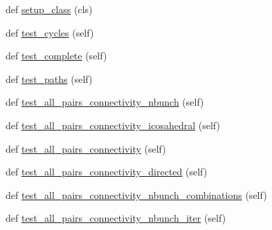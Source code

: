 \begin{DoxyCompactItemize}
\item 
def \hyperlink{classnetworkx_1_1algorithms_1_1connectivity_1_1tests_1_1test__connectivity_1_1TestAllPairsNodeConnectivity_a3beae3db8f0c8ea6da04f67d5e2da9e1}{setup\+\_\+class} (cls)
\item 
def \hyperlink{classnetworkx_1_1algorithms_1_1connectivity_1_1tests_1_1test__connectivity_1_1TestAllPairsNodeConnectivity_aab4446e118725f03c9a0b00e8c8c8572}{test\+\_\+cycles} (self)
\item 
def \hyperlink{classnetworkx_1_1algorithms_1_1connectivity_1_1tests_1_1test__connectivity_1_1TestAllPairsNodeConnectivity_af2610cba7d947b961c60eddbc1d8e4e0}{test\+\_\+complete} (self)
\item 
def \hyperlink{classnetworkx_1_1algorithms_1_1connectivity_1_1tests_1_1test__connectivity_1_1TestAllPairsNodeConnectivity_a4f92d6b9d03a1435046d5fc2400623cc}{test\+\_\+paths} (self)
\item 
def \hyperlink{classnetworkx_1_1algorithms_1_1connectivity_1_1tests_1_1test__connectivity_1_1TestAllPairsNodeConnectivity_a667bfb7580bd235cd559dffde99c143e}{test\+\_\+all\+\_\+pairs\+\_\+connectivity\+\_\+nbunch} (self)
\item 
def \hyperlink{classnetworkx_1_1algorithms_1_1connectivity_1_1tests_1_1test__connectivity_1_1TestAllPairsNodeConnectivity_a84ad95e4da6dd559521119416e0142fa}{test\+\_\+all\+\_\+pairs\+\_\+connectivity\+\_\+icosahedral} (self)
\item 
def \hyperlink{classnetworkx_1_1algorithms_1_1connectivity_1_1tests_1_1test__connectivity_1_1TestAllPairsNodeConnectivity_a5b968eda630249f9706b71400af6c53c}{test\+\_\+all\+\_\+pairs\+\_\+connectivity} (self)
\item 
def \hyperlink{classnetworkx_1_1algorithms_1_1connectivity_1_1tests_1_1test__connectivity_1_1TestAllPairsNodeConnectivity_aa77be05efc093520ea4e78728da5cc40}{test\+\_\+all\+\_\+pairs\+\_\+connectivity\+\_\+directed} (self)
\item 
def \hyperlink{classnetworkx_1_1algorithms_1_1connectivity_1_1tests_1_1test__connectivity_1_1TestAllPairsNodeConnectivity_a2ceaf3ceb94d740efc8cf748e606e640}{test\+\_\+all\+\_\+pairs\+\_\+connectivity\+\_\+nbunch\+\_\+combinations} (self)
\item 
def \hyperlink{classnetworkx_1_1algorithms_1_1connectivity_1_1tests_1_1test__connectivity_1_1TestAllPairsNodeConnectivity_a37522b96fa72671f9d1e57dd7e83c264}{test\+\_\+all\+\_\+pairs\+\_\+connectivity\+\_\+nbunch\+\_\+iter} (self)
\end{DoxyCompactItemize}
